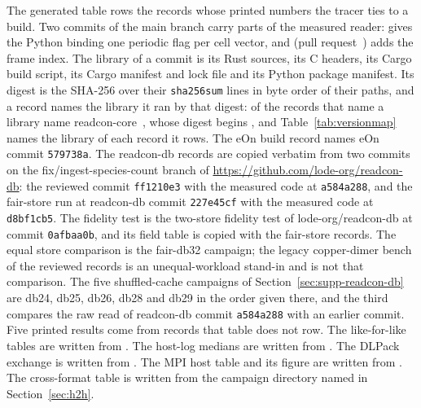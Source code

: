 \documentclass[preprint,12pt]{elsarticle}
\begin{document}


The generated table rows the records whose printed numbers the tracer ties to a build.
Two commits of the main branch carry parts of the measured reader: \texttt{\readconpbccommit} gives the Python binding one periodic flag per cell vector, and \texttt{\readconrcidxcommit} (pull request~\readconrcidxpr) adds the frame index.
The library of a commit is its Rust sources, its C headers, its Cargo build script, its Cargo manifest and lock file and its Python package manifest.
Its digest is the SHA-256 over their \texttt{sha256sum} lines in byte order of their paths, and a record names the library it ran by that digest: \rcRecordDigestCount{} of the \rcDigestRecordCount{} records that name a library name readcon-core~\rcRecordDigestVersion{}, whose digest begins \texttt{\rcRecordDigest}, and Table~\ref*{tab:versionmap} names the library of each record it rows.
The eOn build record names eOn commit \texttt{579738a}.
The readcon-db records are copied verbatim from two commits on the fix/ingest-species-count branch of \url{https://github.com/lode-org/readcon-db}: the reviewed commit \texttt{ff1210e3} with the measured code at \texttt{a584a288}, and the fair-store run at readcon-db commit \texttt{227e45cf} with the measured code at \texttt{d8bf1cb5}.
The fidelity test is the two-store fidelity test of lode-org/readcon-db at commit \texttt{0afbaa0b}, and its field table is copied with the fair-store records.
The equal store comparison is the fair-db32 campaign; the legacy copper-dimer bench of the reviewed records is an unequal-workload stand-in and is not that comparison.
The five shuffled-cache campaigns of Section~\ref*{sec:supp-readcon-db} are db24, db25, db26, db28 and db29 in the order given there, and the third compares the raw read of readcon-db commit \texttt{a584a288} with an earlier commit.
Five printed results come from records that table does not row.
The like-for-like tables are written from .
The host-log medians are written from .
The DLPack exchange is written from .
The MPI host table and its figure are written from .
The cross-format table is written from the campaign directory named in Section~\ref{sec:h2h}.
\end{document}
